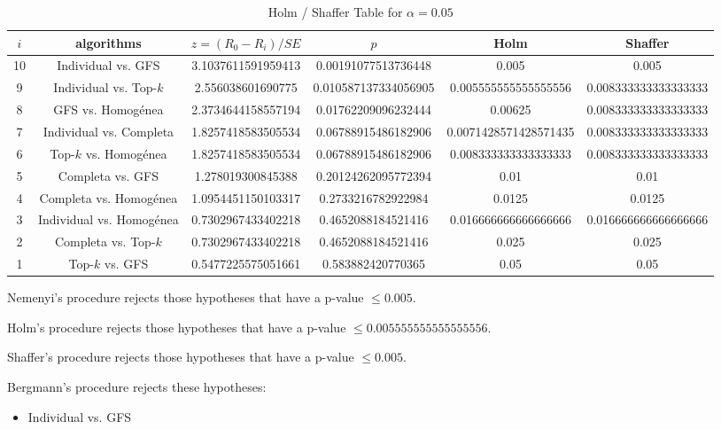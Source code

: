 \documentclass[a4paper,10pt]{article}
\begin{document}
\begin{landscape}
\begin{table}[!htp]
\centering\tiny
\caption{Holm / Shaffer Table for $\alpha=0.05$}
\begin{tabular}{cccccc}
$i$&algorithms&$z=(R_0 - R_i)/SE$&$p$&Holm&Shaffer\\
\hline
10&Individual vs. GFS&3.1037611591959413&0.00191077513736448&0.005&0.005\\
9&Individual vs. Top-$k$&2.556038601690775&0.010587137334056905&0.005555555555555556&0.008333333333333333\\
8&GFS vs. Homogénea&2.3734644158557194&0.01762209096232444&0.00625&0.008333333333333333\\
7&Individual vs. Completa&1.8257418583505534&0.06788915486182906&0.0071428571428571435&0.008333333333333333\\
6&Top-$k$ vs. Homogénea&1.8257418583505534&0.06788915486182906&0.008333333333333333&0.008333333333333333\\
5&Completa vs. GFS&1.278019300845388&0.20124262095772394&0.01&0.01\\
4&Completa vs. Homogénea&1.0954451150103317&0.2733216782922984&0.0125&0.0125\\
3&Individual vs. Homogénea&0.7302967433402218&0.4652088184521416&0.016666666666666666&0.016666666666666666\\
2&Completa vs. Top-$k$&0.7302967433402218&0.4652088184521416&0.025&0.025\\
1&Top-$k$ vs. GFS&0.5477225575051661&0.583882420770365&0.05&0.05\\
\hline
\end{tabular}
\end{table}
Nemenyi's procedure rejects those hypotheses that have a p-value $\le0.005$.


Holm's procedure rejects those hypotheses that have a p-value $\le0.005555555555555556$.


Shaffer's procedure rejects those hypotheses that have a p-value $\le0.005$.


Bergmann's procedure rejects these hypotheses:


\begin{itemize}


\item Individual vs. GFS
\end{itemize}



\end{landscape}
\end{document}
